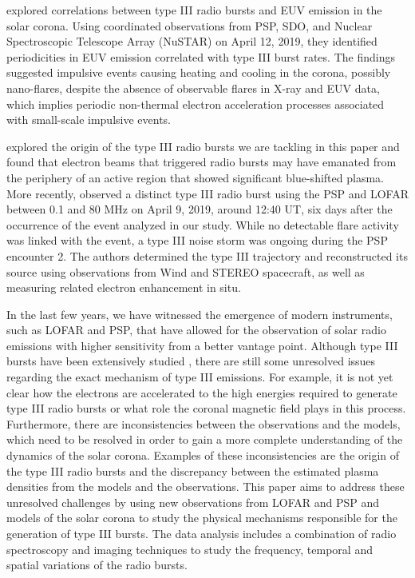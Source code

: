 \citet{Cattell_2021} explored correlations between type III radio bursts and EUV emission in the solar corona. Using coordinated observations from PSP, SDO, and Nuclear Spectroscopic Telescope Array (NuSTAR) on April 12, 2019, they identified periodicities in EUV emission correlated with type III burst rates. The findings suggested impulsive events causing heating and cooling in the corona, possibly nano-flares, despite the absence of observable flares in X-ray and EUV data, which implies periodic non-thermal electron acceleration processes associated with small-scale impulsive events.

\citet{harra2021active} explored the origin of the type III radio bursts we are tackling in this paper and found that electron beams that triggered radio bursts may have emanated from the periphery of an active region that showed significant blue-shifted plasma.
More recently, \citet{badman22} observed a distinct type III radio burst using the PSP and LOFAR between 0.1 and 80 MHz on April 9, 2019, around 12:40 UT, six days after the occurrence of the event analyzed in our study. While no detectable flare activity was linked with the event, a type III noise storm was ongoing during the PSP encounter 2. The authors determined the type III trajectory and reconstructed its source using observations from Wind and STEREO spacecraft, as well as measuring related electron enhancement in situ.

In the last few years, we have witnessed the emergence of modern instruments, such as LOFAR and PSP, that have allowed for the observation of solar radio emissions with higher sensitivity from a better vantage point. Although type III bursts have been extensively studied \citep{dabrowski21}, there are still some unresolved issues regarding the exact mechanism of type III emissions.
For example, it is not yet clear how the electrons are accelerated to the high energies required to generate type III radio bursts or what role the coronal magnetic field plays in this process.
Furthermore, there are inconsistencies between the observations and the models, which need to be resolved in order to gain a more complete understanding of the dynamics of the solar corona. Examples of these inconsistencies are the origin of the type III radio bursts and the discrepancy between the estimated plasma densities from the models and the observations. This paper aims to address these unresolved challenges by using new observations from LOFAR and PSP and models of the solar corona to study the physical mechanisms responsible for the generation of type III bursts.
The data analysis includes a combination of radio spectroscopy and imaging techniques to study the frequency, temporal and spatial variations of the radio bursts. 

